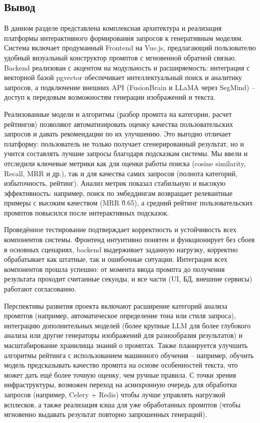 \subsection{Вывод}
В данном разделе представлена комплексная архитектура и реализация платформы интерактивного формирования запросов к генеративным моделям. Система включает продуманный Frontend на Vue.js, предлагающий пользователю удобный визуальный конструктор промптов с мгновенной обратной связью. Backend реализован с акцентом на модульность и расширяемость: интеграция с векторной базой pgvector обеспечивает интеллектуальный поиск и аналитику запросов, а подключение внешних API (FusionBrain и LLaMA через SegMind) – доступ к передовым возможностям генерации изображений и текста.

Реализованные модели и алгоритмы (разбор промпта на категории, расчет рейтингов) позволяют автоматизировать оценку качества пользовательских запросов и давать рекомендации по их улучшению. Это выгодно отличает платформу: пользователь не только получает сгенерированный результат, но и учится составлять лучшие запросы благодаря подсказкам системы. Мы ввели и отследили ключевые метрики как для оценки работы поиска (cosine similarity, Recall\@K, MRR и др.), так и для качества самих запросов (полнота категорий, избыточность, рейтинг). Анализ метрик показал стабильную и высокую эффективность: например, поиск по эмбеддингам возвращает релевантные примеры с высоким качеством (MRR \~0.65), а средний рейтинг пользовательских промптов повысился после интерактивных подсказок.

Проведённое тестирование подтверждает корректность и устойчивость всех компонентов системы. Фронтенд интуитивно понятен и функционирует без сбоев в основных сценариях, backend выдерживает заданную нагрузку, корректно обрабатывает как штатные, так и ошибочные ситуации. Интеграция всех компонентов прошла успешно: от момента ввода промпта до получения результата проходит считанные секунды, и все части (UI, БД, внешние сервисы) работают согласованно.

Перспективы развития проекта включают расширение категорий анализа промптов (например, автоматическое определение тона или стиля запроса), интеграцию дополнительных моделей (более крупные LLM для более глубокого анализа или другие генераторы изображений для разнообразия результатов) и масштабирование хранилища знаний о промптах. Также планируется улучшить алгоритмы рейтинга с использованием машинного обучения – например, обучить модель предсказывать качество промпта на основе особенностей текста, что может дать ещё более точную оценку, чем ручные правила. С точки зрения инфраструктуры, возможен переход на асинхронную очередь для обработки запросов (например, Celery + Redis) чтобы лучше управлять нагрузкой всплесков, а также реализация кэша для уже обработанных промптов (чтобы мгновенно выдавать результат повторно запрошенных генераций).

